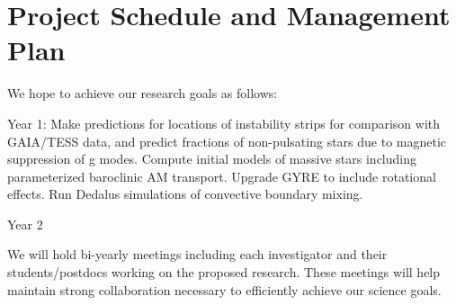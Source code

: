 \section{Project Schedule and Management Plan}

We hope to achieve our research goals as follows:

Year 1: Make predictions for locations of instability strips for comparison with GAIA/TESS data, and predict fractions of non-pulsating stars due to magnetic suppression of g modes. Compute initial models of massive stars including parameterized baroclinic AM transport. Upgrade GYRE to include rotational effects. Run Dedalus simulations of convective boundary mixing.

Year 2

We will  hold bi-yearly meetings including each investigator and their students/postdocs working on the proposed research. These meetings will help maintain strong collaboration necessary to efficiently achieve our science goals.
